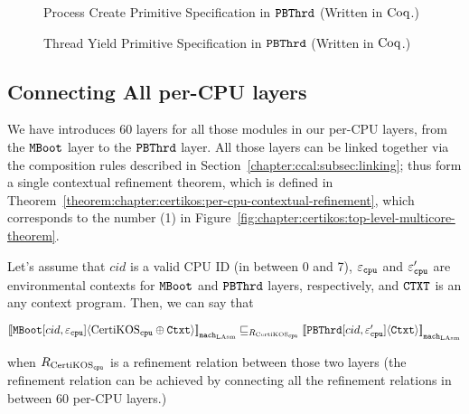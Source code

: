 \begin{figure}
 
\caption{Process Create Primitive Specification in ${\mathrm{\texttt{PBThrd}}}$ (Written in $\mathrm{Coq}$.)}
\label{fig:chapter:certikos:proc-create-cpu-spec}
\end{figure}


\begin{figure}
 
\caption{Thread Yield Primitive Specification in ${\mathrm{\texttt{PBThrd}}}$ (Written in $\mathrm{Coq}$.)}
\label{fig:chapter:certikos:thread-yield-cpu-spec} 
\end{figure}


\subsection{Connecting All per-CPU layers}
\label{chapter:certikos:subsec:connecting-all-per-cpu-layers}

We have introduces 60 layers for all those modules in our per-CPU layers, from the ${\mathrm{\texttt{MBoot}}}$ layer to the 
${\mathrm{\texttt{PBThrd}}}$ layer.
All those layers can be linked together via the composition rules described in Section~\ref{chapter:ccal:subsec:linking};
thus form a single contextual refinement theorem, which is defined in Theorem~\ref{theorem:chapter:certikos:per-cpu-contextual-refinement},
which corresponds to the number (1) in Figure~\ref{fig:chapter:certikos:top-level-multicore-theorem}.
\begin{theorem}
\label{theorem:chapter:certikos:per-cpu-contextual-refinement}
Let's assume that $cid$ is a valid CPU ID (in between 0 and 7), ${\varepsilon}_{{\mathrm{\texttt{cpu}}}}$ and  ${\varepsilon}'_{{\mathrm{\texttt{cpu}}}}$ are 
environmental contexts for ${\mathrm{\texttt{MBoot}}}$  and ${\mathrm{\texttt{PBThrd}}}$ layers, respectively, and ${\mathrm{\texttt{CTXT}}}$ is an any context program. Then, we can say that
\begin{center}
${[\![{{\mathrm{\texttt{MBoot}}}[cid, {\varepsilon}_{{\mathrm{\texttt{cpu}}}}]} \langle {\mathrm{CertiKOS}_{{\mathrm{\texttt{cpu}}}} \oplus {\mathrm{\texttt{Ctxt}}}} \rangle]\!]}_{{\mathrm{\texttt{mach}}}_{\mathrm{LAsm}}} \sqsubseteq_{R_{\mathrm{CertiKOS}_{\mathrm{\texttt{cpu}}}}} {[\![{{\mathrm{\texttt{PBThrd}}}[cid, {\varepsilon}'_{{\mathrm{\texttt{cpu}}}}]} \langle {{\mathrm{\texttt{Ctxt}}}} \rangle]\!]}_{{{\mathrm{\texttt{mach}}}_{\mathrm{LAsm}}}}$
\end{center}
when ${R_{\mathrm{CertiKOS}_{\mathrm{\texttt{cpu}}}}}$ is a refinement relation between those two layers (the refinement relation can be achieved by 
connecting all the refinement relations in between 60 per-CPU layers.)
\end{theorem}

